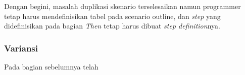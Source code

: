 Dengan begini, masalah duplikasi skenario terselesaikan namun programmer tetap
harus mendefinisikan tabel pada scenario outline, dan \textit{step} yang didefinisikan
pada bagian \textit{Then} tetap harus dibuat \textit{step definition}nya.

\subsubsection{Variansi}

Pada bagian sebelumnya telah






